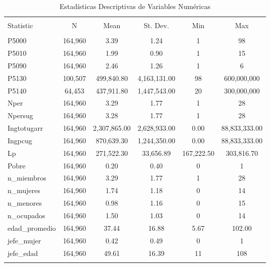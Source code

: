 
\begin{table}[!htbp] \centering 
  \caption{Estadísticas Descriptivas de Variables Numéricas} 
  \label{tab:descriptive_stats} 
\begin{tabular}{@{\extracolsep{5pt}}lccccc} 
\\[-1.8ex]\hline 
\hline \\[-1.8ex] 
Statistic & \multicolumn{1}{c}{N} & \multicolumn{1}{c}{Mean} & \multicolumn{1}{c}{St. Dev.} & \multicolumn{1}{c}{Min} & \multicolumn{1}{c}{Max} \\ 
\hline \\[-1.8ex] 
P5000 & 164,960 & 3.39 & 1.24 & 1 & 98 \\ 
P5010 & 164,960 & 1.99 & 0.90 & 1 & 15 \\ 
P5090 & 164,960 & 2.46 & 1.26 & 1 & 6 \\ 
P5130 & 100,507 & 499,840.80 & 4,163,131.00 & 98 & 600,000,000 \\ 
P5140 & 64,453 & 437,911.80 & 1,447,543.00 & 20 & 300,000,000 \\ 
Nper & 164,960 & 3.29 & 1.77 & 1 & 28 \\ 
Npersug & 164,960 & 3.28 & 1.77 & 1 & 28 \\ 
Ingtotugarr & 164,960 & 2,307,865.00 & 2,628,933.00 & 0.00 & 88,833,333.00 \\ 
Ingpcug & 164,960 & 870,639.30 & 1,244,350.00 & 0.00 & 88,833,333.00 \\ 
Lp & 164,960 & 271,522.30 & 33,656.89 & 167,222.50 & 303,816.70 \\ 
Pobre & 164,960 & 0.20 & 0.40 & 0 & 1 \\ 
n\_miembros & 164,960 & 3.29 & 1.77 & 1 & 28 \\ 
n\_mujeres & 164,960 & 1.74 & 1.18 & 0 & 14 \\ 
n\_menores & 164,960 & 0.98 & 1.16 & 0 & 15 \\ 
n\_ocupados & 164,960 & 1.50 & 1.03 & 0 & 14 \\ 
edad\_promedio & 164,960 & 37.44 & 16.88 & 5.67 & 102.00 \\ 
jefe\_mujer & 164,960 & 0.42 & 0.49 & 0 & 1 \\ 
jefe\_edad & 164,960 & 49.61 & 16.39 & 11 & 108 \\ 
\hline \\[-1.8ex] 
\end{tabular} 
\end{table} 
